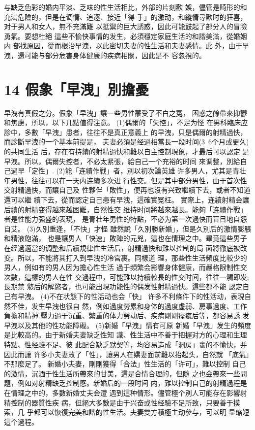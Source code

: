 \documentclass[12pt,UTF8]{ctexbook}
\begin{document}
与缺乏色彩的婚内平淡、乏味的性生活相比，外部的片刻歡
娛，儘管是畸形的和充滿危險的，但是在调情、追逐、接近「得
手」的激动，和縱情尋歡时的狂喜，对于男人和女人，無不充滿難
以抵禦的巨大誘惑，因此可能鼓起了部分人的冒險勇氣。要想杜絕
這些不愉快事情的发生，必須穩定家庭生活的和諧美滿，從婚姻内
部找原因，從而根治早洩，以此密切夫妻的性生活和夫妻感情。此
外，由于早洩，還可能与部分危害身体健康的疾病相關，因此是不
容忽視的。

\section{14 假象「早洩」別擔憂}

早洩有真假之分。假象「早洩」讓一些男性蒙受了不白之冤，
困惑之餘帶來抑鬱和焦慮，所以，以下几點值得注意。
(1)偶爾的「失控」，不足为怪
在男科臨床应診中，多數「早洩」患者，往往不是真正意義上
的早洩，只是偶爾的射精過快，而診斷早洩的一个基本前提是，
夫妻必須是经過相當長一段时间(3~6个月或更久)的共同生活
后，存在有持續的射精過快和難以自主控制現象，才最后可以認定
是早洩。所以，偶爾失控者，不必太紧張，給自己一个充裕的时间
來调整，別給自己過早「定性」.
(2)能「连續作戰」者，別以初次論英雄
许多男人，尤其是青壮年男性，往往可以在一天内连續多次进
行性交。但是其中部分男性，由于首次性交射精過快，而讓自己及
性夥伴「敗性」，便再也沒有兴致繼續下去，或者不知道還可以繼
續下去，從而認定自己患有早洩，這確實冤枉。
實際上，连續射精会讓后續的射精变得越來越困難，自然性交
维持时间將越來越長。能夠「连續作戰」者是性能力强盛的表現，
是青壮年男性的特點，不必为第一次過快而盲目地自怨自艾。
(3)久別重逢，「不快」才怪
雖然說「久別勝新婚」，但是久別后的激情膨脹和精液飽滿，
也是讓男人「快速」敗陣的元兇，這也在情理之中。畢竟這些男子
在经過適當的调整和后續規律性生活后，射精過快和難以控制的局
面將徹底被改变。所以，不能將其打入到早洩的冷宫裹。同樣道
理，那些性生活頻度比較少的男人，例如有的男人因为擔心性生活
過于頻繁会影響身体健康，而嚴格限制性交次數，這樣的男人在性
交過程中，可能難以持續較長的性交时间，往往一觸即发;長期禁
慾后的解慾者，也可能出現功能性的偶发性射精過快。這些都不能
認定自己有早洩。
(4)不在状態下的性活动也会「快」
许多不利條件下的性活动，表現自然不佳，发生早洩也很自
然，例如過度勞累和身体的過度虚弱、房事過度、工作負擔和精神
壓力過于沉重、繁重的体力勞动后、疾病剛剛痊癒后等，都容易誘
发早洩以及其他的性功能障礙。
(5)新婚「早洩」情有可原
新婚「早洩」发生的頻度是比較高的。由于新婚夫妻缺乏性知
識、性生活中不善于把握对方的心理和生理特點、性经驗不足、彼
此配合缺乏默契等，均容易造成「洞房」裹的不愉快，并因此而讓
许多小夫妻敗了「性」，讓男人在嬌妻面前難以抬起头，自然就
「底氣」不那麼足了。
新婚小夫妻，剛剛獲得「合法」性生活的「许可」，難以控制
自己的激情，沉湎于性生活所帶來的甘美，這是合情合理的，但隨
之也会帶來一些問題，例如对射精缺乏控制感。新婚后的一段时间
内，難以控制自己的射精過程是在情理之中的，多數新婚丈夫会遭
遇到這种情形。儘管極个別人可能存在影響射精控制的器質性疾
病，但絕大多數是由于兴奋或性经驗不足所致，只要善于摸索，几
乎都可以恢復完美和諧的性生活。夫妻雙方積極主动參与，可以明
显缩短這个過程。
\end{document}

